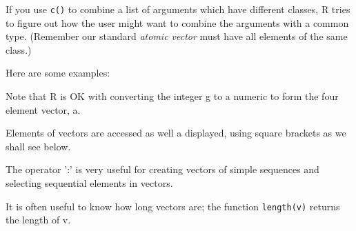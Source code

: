 \documentclass[titlepage]{book}\usepackage{knitr}
\begin{document}
If you use \texttt{c()} to combine  a list of arguments which have different classes, R tries to figure out how the user might want to combine the arguments with a common type. (Remember our standard \emph{atomic vector} must have all elements of the same class.)

Here are some examples:
\begin{knitrout}
\color{fgcolor}\begin{kframe}
\begin{alltt}
\hlcom{#----------------------------------------------------------------------------------}
 \hlkwb{<-} 
 \hlkwb{<-} 
 \hlkwb{<-}  \hlopt{+} 
 \hlkwb{<-}   
     
 \hlkwb{<-} 
 \hlkwb{<-} \hlstd{,} \hlstd{)}
 \hlkwb{<-} \hlstd{)}
 \hlkwb{<-} 
 \hlkwb{<-} \hlstd{(}\hlstd{,}\hlstd{,}\hlstd{)}
\hlcom{#----------------------------------------------------------------------------------}
\end{alltt}
\end{kframe}
\end{knitrout}
Note that R is OK with converting the integer g to a numeric to form the four element vector, a.

Elements of vectors are accessed as well a displayed, using square brackets as we shall see below.

The operator ':' is very useful for creating vectors of simple sequences and selecting sequential elements in vectors.


It is often useful to know how long vectors are; the function \texttt{length(v)} returns the length of v.
\end{document}
